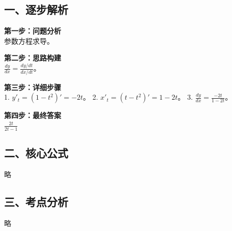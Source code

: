 \documentclass[12pt, a4paper]{ctexart}
\newenvironment{RedAnalysis}{
    \par
    \color{red} %
}{
    \par
    \color{black} %
}
\begin{document}
\begin{RedAnalysis}

\subsection*{一、逐步解析}

\textbf{第一步：问题分析} \\
参数方程求导。

\textbf{第二步：思路构建} \\
$\frac{dy}{dx} = \frac{dy/dt}{dx/dt}$。

\textbf{第三步：详细步骤} \\
1. $y'_t = (1-t^2)' = -2t$。
2. $x'_t = (t-t^2)' = 1-2t$。
3. $\frac{dy}{dx} = \frac{-2t}{1-2t}$。

\textbf{第四步：最终答案} \\
$\frac{2t}{2t-1}$

\subsection*{二、核心公式}
略

\subsection*{三、考点分析}
略

\end{RedAnalysis}
\end{document}
